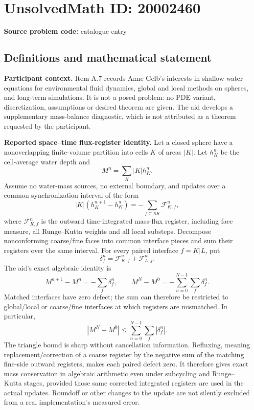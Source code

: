 \documentclass[11pt]{article}
\begin{document}
\section*{UnsolvedMath ID: 20002460}
\textbf{Source problem code:} catalogue entry
\subsection{Definitions and mathematical statement}
\textbf{Participant context.} Item A.7 records Anne Gelb's interests in shallow-water equations for environmental fluid dynamics, global and local methods on spheres, and long-term simulations. It is not a posed problem: no PDE variant, discretization, assumptions or desired theorem are given. The aid develops a supplementary mass-balance diagnostic, which is not attributed as a theorem requested by the participant.

\textbf{Reported space--time flux-register identity.} Let a closed sphere have a nonoverlapping finite-volume partition into cells \(K\) of areas \(|K|\). Let \(h_K^n\) be the cell-average water depth and
\[
 M^n=\sum_K|K|h_K^n.
\]
Assume no water-mass sources, no external boundary, and updates over a common synchronization interval of the form
\[
 |K|(h_K^{n+1}-h_K^n)=-\sum_{f\subseteq\partial K}\mathcal F_{K,f}^n,
\]
where \(\mathcal F_{K,f}^n\) is the outward time-integrated mass-flux register, including face measure, all Runge--Kutta weights and all local substeps. Decompose nonconforming coarse/fine faces into common interface pieces and sum their registers over the same interval. For every paired interface \(f=K|L\), put
\[
 \delta_f^n=\mathcal F_{K,f}^n+\mathcal F_{L,f}^n.
\]
The aid's exact algebraic identity is
\[
 M^{n+1}-M^n=-\sum_f\delta_f^n,
 \qquad
 M^N-M^0=-\sum_{n=0}^{N-1}\sum_f\delta_f^n.
\]
Matched interfaces have zero defect; the sum can therefore be restricted to global/local or coarse/fine interfaces at which registers are mismatched. In particular,
\[
 |M^N-M^0|\leq\sum_{n=0}^{N-1}\sum_f|\delta_f^n|.
\]
The triangle bound is sharp without cancellation information. Refluxing, meaning replacement/correction of a coarse register by the negative sum of the matching fine-side outward registers, makes each paired defect zero. It therefore gives exact mass conservation in algebraic arithmetic even under subcycling and Runge--Kutta stages, provided those same corrected integrated registers are used in the actual updates. Roundoff or other changes to the update are not silently excluded from a real implementation's measured error.
\end{document}
